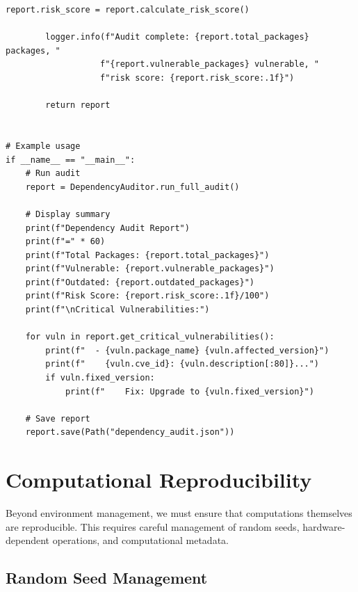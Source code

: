 \begin{lstlisting}[style=python, caption={Dependency auditing and vulnerability scanning}]
        report.risk_score = report.calculate_risk_score()

        logger.info(f"Audit complete: {report.total_packages} packages, "
                   f"{report.vulnerable_packages} vulnerable, "
                   f"risk score: {report.risk_score:.1f}")

        return report


# Example usage
if __name__ == "__main__":
    # Run audit
    report = DependencyAuditor.run_full_audit()

    # Display summary
    print(f"Dependency Audit Report")
    print(f"=" * 60)
    print(f"Total Packages: {report.total_packages}")
    print(f"Vulnerable: {report.vulnerable_packages}")
    print(f"Outdated: {report.outdated_packages}")
    print(f"Risk Score: {report.risk_score:.1f}/100")
    print(f"\nCritical Vulnerabilities:")

    for vuln in report.get_critical_vulnerabilities():
        print(f"  - {vuln.package_name} {vuln.affected_version}")
        print(f"    {vuln.cve_id}: {vuln.description[:80]}...")
        if vuln.fixed_version:
            print(f"    Fix: Upgrade to {vuln.fixed_version}")

    # Save report
    report.save(Path("dependency_audit.json"))
\end{lstlisting}

\section{Computational Reproducibility}

Beyond environment management, we must ensure that computations themselves are reproducible. This requires careful management of random seeds, hardware-dependent operations, and computational metadata.

\subsection{Random Seed Management}

